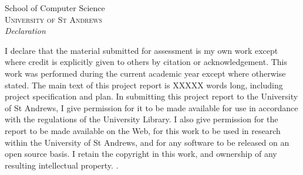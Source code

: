 \newpage
\thispagestyle{empty}

\begin{center}

\huge{School of Computer Science}\\[0.5cm]
\normalsize
\textsc{University of St Andrews}\\[2.0cm]

\emph{\LARGE Declaration}\\[2.5cm]
\end{center}
\normalsize I declare that the material submitted for assessment is my own work except where credit is explicitly given to others by citation or acknowledgement. This work was performed during the current academic year except where otherwise stated. The main text of this project report is XXXXX words long, including project specification and plan. In submitting this project report to the University of St Andrews, I give permission for it to be made available for use in accordance with the regulations of the University Library. I also give permission for the report to be made available on the Web, for this work to be used in research within the University of St Andrews, and for any software to be released on an open source basis. I retain the copyright in this work, and ownership of any resulting intellectual property.
.\\[1.0cm]

\vfill